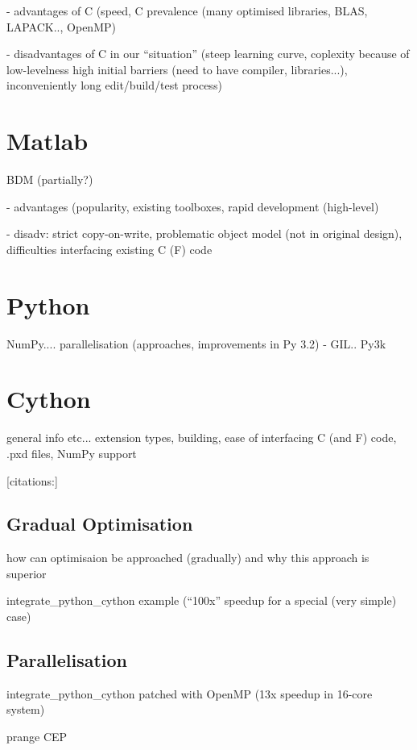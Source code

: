  - advantages of C (speed, C prevalence (many optimised libraries, BLAS, LAPACK.., OpenMP)

 - disadvantages of C in our ``situation'' (steep learning curve, coplexity because of low-levelness
   high initial barriers (need to have compiler, libraries...), inconveniently long edit/build/test
   process)

\section{Matlab}

BDM (partially?)

 - advantages (popularity, existing toolboxes, rapid development (high-level)

 - disadv: strict copy-on-write, problematic object model (not in original design), difficulties
           interfacing existing C (F) code

\section{Python}

NumPy.... parallelisation (approaches, improvements in Py 3.2) - GIL.. Py3k

\section{Cython}

general info etc... extension types, building, ease of interfacing C (and F) code, .pxd files,
NumPy support

[citations:\cite{BehBraSel:09,Sel:09,BehBraCitDalSelSmi:11}]

\subsection{Gradual Optimisation}

how can optimisaion be approached (gradually) and why this approach is superior

integrate\_python\_cython example (``100x'' speedup for a special (very simple) case)

\subsection{Parallelisation}

integrate\_python\_cython patched with OpenMP (13x speedup in 16-core system)

prange CEP

